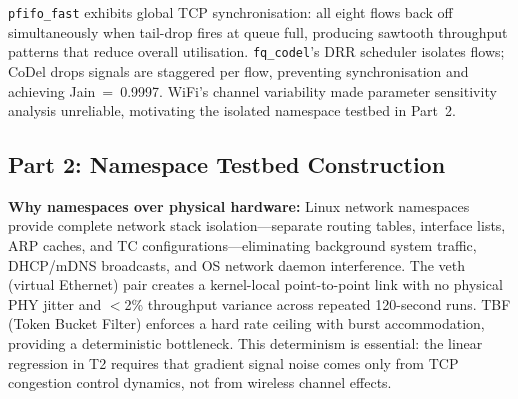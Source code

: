 \documentclass[conference]{IEEEtran}
\begin{document}
\texttt{pfifo\_fast} exhibits global TCP synchronisation: all eight flows back
off simultaneously when tail-drop fires at queue full, producing sawtooth
throughput patterns that reduce overall utilisation. \texttt{fq\_codel}'s DRR
scheduler isolates flows; CoDel drops signals are staggered per flow,
preventing synchronisation and achieving Jain~=~0.9997. WiFi's channel
variability made parameter sensitivity analysis unreliable, motivating the
isolated namespace testbed in Part~2.

\subsection{Part 2: Namespace Testbed Construction}

\textbf{Why namespaces over physical hardware:} Linux network namespaces provide
complete network stack isolation---separate routing tables, interface lists, ARP
caches, and TC configurations---eliminating background system traffic,
DHCP/mDNS broadcasts, and OS network daemon interference. The veth (virtual
Ethernet) pair creates a kernel-local point-to-point link with no physical PHY
jitter and $<$2\% throughput variance across repeated 120-second runs. TBF
(Token Bucket Filter) enforces a hard rate ceiling with burst accommodation,
providing a deterministic bottleneck. This determinism is essential: the linear
regression in T2 requires that gradient signal noise comes only from TCP
congestion control dynamics, not from wireless channel effects.
\end{document}
